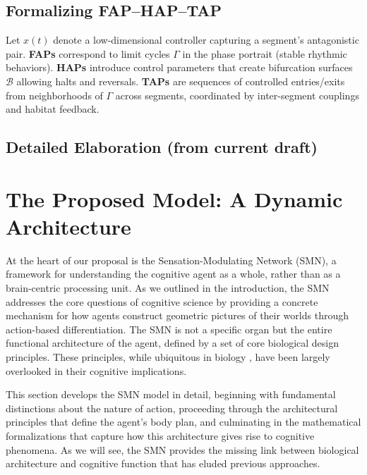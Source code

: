\subsection{Formalizing FAP--HAP--TAP}
Let $x(t)$ denote a low-dimensional controller capturing a segment's antagonistic pair. 
\textbf{FAPs} correspond to limit cycles $\Gamma$ in the phase portrait (stable rhythmic behaviors). 
\textbf{HAPs} introduce control parameters that create bifurcation surfaces $\mathcal{B}$ allowing halts and reversals. 
\textbf{TAPs} are sequences of controlled entries/exits from neighborhoods of $\Gamma$ across segments, 
coordinated by inter-segment couplings and habitat feedback. 

\subsection{Detailed Elaboration (from current draft)}

\section{The Proposed Model: A Dynamic Architecture}
\label{sec:model}
At the heart of our proposal is the Sensation-Modulating Network (SMN), a framework for understanding the cognitive agent as a whole, rather than as a brain-centric processing unit. As we outlined in the introduction, the SMN addresses the core questions of cognitive science by providing a concrete mechanism for how agents construct geometric pictures of their worlds through action-based differentiation. The SMN is not a specific organ but the entire functional architecture of the agent, defined by a set of core biological design principles. These principles, while ubiquitous in biology \cite{hyman1940invertebrates}, have been largely overlooked in their cognitive implications.

This section develops the SMN model in detail, beginning with fundamental distinctions about the nature of action, proceeding through the architectural principles that define the agent's body plan, and culminating in the mathematical formalizations that capture how this architecture gives rise to cognitive phenomena. As we will see, the SMN provides the missing link between biological architecture and cognitive function that has eluded previous approaches.

